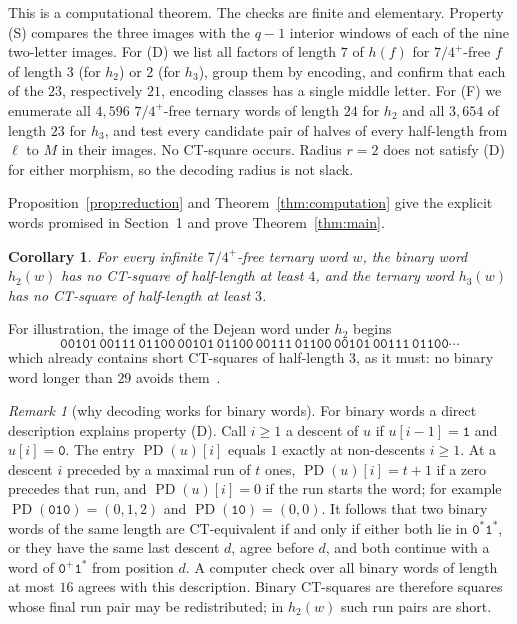 \documentclass[11pt]{amsart}
\newtheorem{corollary}[theorem]{Corollary}
\theoremstyle{definition}
\theoremstyle{remark}
\newtheorem{remark}[theorem]{Remark}
\newcommand{\PD}{\operatorname{PD}}
\newcommand{\tw}{\mathtt}
\begin{document}
This is a computational theorem. The checks are finite and elementary. Property (S) compares the three images with the $q-1$ interior windows of each of the nine two-letter images. For (D) we list all factors of length $7$ of $h(f)$ for $7/4^+$-free $f$ of length $3$ (for $h_2$) or $2$ (for $h_3$), group them by encoding, and confirm that each of the $23$, respectively $21$, encoding classes has a single middle letter. For (F) we enumerate all $4{,}596$ $7/4^+$-free ternary words of length $24$ for $h_2$ and all $3{,}654$ of length $23$ for $h_3$, and test every candidate pair of halves of every half-length from $\ell$ to $M$ in their images. No CT-square occurs. Radius $r=2$ does not satisfy (D) for either morphism, so the decoding radius is not slack.

Proposition~\ref{prop:reduction} and Theorem~\ref{thm:computation} give the explicit words promised in Section~1 and prove Theorem~\ref{thm:main}.

\begin{corollary}
For every infinite $7/4^+$-free ternary word $w$, the binary word $h_2(w)$ has no CT-square of half-length at least $4$, and the ternary word $h_3(w)$ has no CT-square of half-length at least $3$.
\end{corollary}

For illustration, the image of the Dejean word under $h_2$ begins
\[
\tw{00101\,00111\,01100\,00101\,01100\,00111\,01100\,00101\,00111\,01100\cdots}
\]
which already contains short CT-squares of half-length $3$, as it must: no binary word longer than $29$ avoids them~\cite{SMKI2026}.

\begin{remark}[why decoding works for binary words]\label{rem:binary}
For binary words a direct description explains property (D). Call $i\ge1$ a descent of $u$ if $u[i-1]=\tw1$ and $u[i]=\tw0$. The entry $\PD(u)[i]$ equals $1$ exactly at non-descents $i\ge1$. At a descent $i$ preceded by a maximal run of $t$ ones, $\PD(u)[i]=t+1$ if a zero precedes that run, and $\PD(u)[i]=0$ if the run starts the word; for example $\PD(\tw{010})=(0,1,2)$ and $\PD(\tw{10})=(0,0)$. It follows that two binary words of the same length are CT-equivalent if and only if either both lie in $\tw0^*\tw1^*$, or they have the same last descent $d$, agree before $d$, and both continue with a word of $\tw0^+\tw1^*$ from position $d$. A computer check over all binary words of length at most $16$ agrees with this description. Binary CT-squares are therefore squares whose final run pair may be redistributed; in $h_2(w)$ such run pairs are short.
\end{remark}
\end{document}
